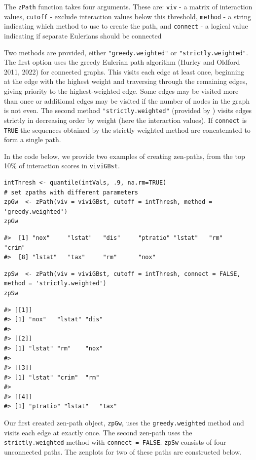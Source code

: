 The \texttt{zPath} function takes four arguments. These are:
\texttt{viv} - a matrix of interaction values,
\texttt{cutoff} - exclude interaction values below this threshold,
\texttt{method} - a string indicating which method to use to create the path, and
\texttt{connect} - a logical value indicating if separate Eulerians should be connected

Two methods are provided, either \texttt{"greedy.weighted"} or \texttt{"strictly.weighted"}. The first option uses the greedy Eulerian path algorithm (Hurley and Oldford 2011, 2022) for connected graphs. This visits each edge at least once, beginning at the edge with the highest weight and traversing through the remaining edges, giving priority to the highest-weighted edge. Some edges may be visited more than once or additional edges may be visited if the number of nodes in the graph is not even. The second method \texttt{"strictly.weighted"} (provided by ) visits edges strictly in decreasing order by weight (here the interaction values). If \texttt{connect} is \texttt{TRUE} the sequences obtained by the strictly weighted method are concatenated to form a single path.

In the code below, we provide two examples of creating zen-paths, from the top 10\% of interaction scores in \texttt{viviGBst}.

\begin{verbatim}
intThresh <- quantile(intVals, .9, na.rm=TRUE)
# set zpaths with different parameters
zpGw  <- zPath(viv = viviGBst, cutoff = intThresh, method = 'greedy.weighted')
zpGw
\end{verbatim}

\begin{verbatim}
#>  [1] "nox"     "lstat"   "dis"     "ptratio" "lstat"   "rm"      "crim"   
#>  [8] "lstat"   "tax"     "rm"      "nox"
\end{verbatim}

\begin{verbatim}
zpSw  <- zPath(viv = viviGBst, cutoff = intThresh, connect = FALSE, method = 'strictly.weighted')
zpSw
\end{verbatim}

\begin{verbatim}
#> [[1]]
#> [1] "nox"   "lstat" "dis"  
#> 
#> [[2]]
#> [1] "lstat" "rm"    "nox"  
#> 
#> [[3]]
#> [1] "lstat" "crim"  "rm"   
#> 
#> [[4]]
#> [1] "ptratio" "lstat"   "tax"
\end{verbatim}

Our first created zen-path object, \texttt{zpGw}, uses the \texttt{greedy.weighted} method and visits each edge at exactly once. The second zen-path uses the \texttt{strictly.weighted} method with \texttt{connect\ =\ FALSE}.
\texttt{zpSw} consists of four unconnected paths.
The zenplots for two of these paths are constructed below.

